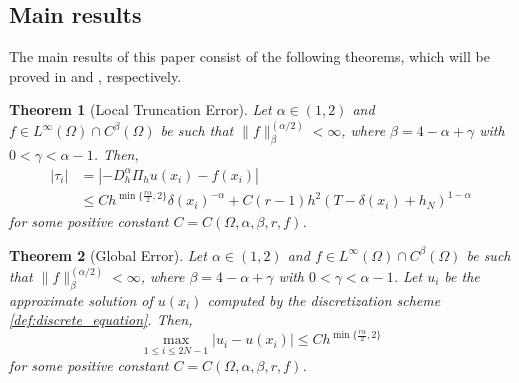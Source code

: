 \documentclass{amsart}
\newtheorem{theorem}{Theorem}[section]
\theoremstyle{definition}
\theoremstyle{remark}
\numberwithin{equation}{section}
\begin{document}





\subsection{Main results}
\label{sec:main}


The main results of this paper consist of the following theorems, which will be proved in  and , respectively.

\begin{theorem}[Local Truncation Error] \label{thm:truncation-error}
Let $\alpha \in (1,2)$ and  $f\in L^\infty(\Omega) \cap C^\beta(\Omega)$ be such that \( \|f\|_{\beta}^{(\alpha/2)} < \infty\), where $\beta=4-\alpha+\gamma$ with \(0<\gamma<\alpha-1\).
Then,
\begin{equation*} %
  \begin{aligned}
    |\tau_i| &= | - D_h^{\alpha} \Pi_hu(x_i) - f(x_i) | \\
    &\le  C  h^{\min\{\frac{r\alpha}{2}, 2\}} \delta(x_i)^{-\alpha}
        + C(r-1) h^2 (T-\delta(x_{i}) + h_N)^{1-\alpha}
  \end{aligned}
\end{equation*}
for some positive constant \(C=C(\Omega, \alpha, \beta, r, f)\).
\end{theorem}


\begin{theorem}[Global Error]\label{thm:convergence}
Let $\alpha \in (1,2)$ and  $f\in L^\infty(\Omega) \cap C^\beta(\Omega)$ be such that \( \|f\|_{\beta}^{(\alpha/2)} < \infty\), where $\beta=4-\alpha+\gamma$ with \(0<\gamma<\alpha-1\).
Let \(u_i\) be the approximate solution of \(u(x_i )\) computed by the discretization scheme \eqref{def:discrete_equation}. Then,
\begin{equation*} %
  \max_{1\le i \le 2N-1} |u_i - u(x_i)| \le C h^{\min\{\frac{r\alpha}{2}, 2\}}
\end{equation*}
for some positive constant \(C=C(\Omega, \alpha, \beta, r, f)\).  
\end{theorem}
\end{document}
